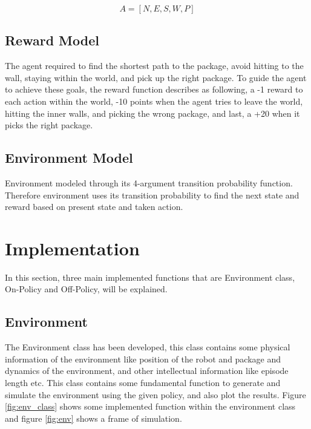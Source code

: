 \documentclass[lettersize,journal]{IEEEtran}
\begin{document}
\begin{equation}
A = [N, E, S, W, P]
\end{equation}


\subsection{Reward Model}
The agent required to find the shortest path to the package, avoid hitting to the wall, staying within the world, and pick up the right package. To guide the agent to achieve these goals, the reward function describes as following, a -1 reward to each action within the world, -10 points when the agent tries to leave the world, hitting the inner walls, and picking the wrong package, and last, a +20 when it picks the right package.


\subsection{Environment Model}
Environment modeled through its 4-argument transition probability function. Therefore environment uses its transition probability to find the next state and reward based on present state and taken action.


\section{Implementation}
In this section, three main implemented functions that are Environment class, On-Policy and Off-Policy, will be explained.



\subsection{Environment}
The Environment class has been developed, this class contains some physical information of the environment like position of the robot and package and dynamics of the environment, and other intellectual information like episode length etc. This class contains some fundamental function to generate and simulate the environment using the given policy, and also plot the results. Figure \ref{fig:env_class} shows some implemented function within the environment class and figure \ref{fig:env} shows a frame of simulation.
\end{document}
